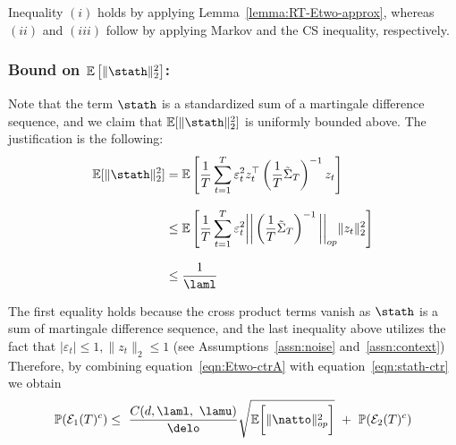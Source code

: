 \documentclass[11pt,letterpaper]{article}
\newcommand{\Prob}{\mathbb{P}}
\newcommand{\Exs}{\mathbb{E}}
\newcommand{\z}{z}
\newcommand{\PT}{\tilde{\Sigma}_T}
\newcommand{\Eone}{\mathcal{E}_1(T)}
\newcommand{\Etwo}{\mathcal{E}_2(T)}
\theoremstyle{plain}
\theoremstyle{definition}  %
\begin{document}
\noindent Inequality $(i)$ holds by applying Lemma~\ref{lemma:RT-Etwo-approx}, whereas $(ii)$ and $(iii)$ follow by applying Markov and the CS inequality, respectively.

\subsubsection*{Bound on $\Exs \left[ \|\stath \|^2_2 \right]$:}
Note that the term $\stath$ is a standardized sum of a martingale difference sequence, and we claim that $\Exs [ \|\stath \|^2_2 ]$ is uniformly bounded above. The justification is the following: 
\begin{align}\label{eqn:stath-ctr}
\notag
   \Exs[\|\stath \|^2_2] 
   & = \Exs \left[ \frac{1}{T} \sum^T_{t=1} \varepsilon_t^2 \z_t^{\top} \left( \frac{1}{T} \PT\right)^{-1} \z_t \right]\\[8pt] \notag
   & \leq \Exs \left[ \frac{1}{T} \sum^T_{t=1} \varepsilon_t^2  \bigg| \bigg|\left( \frac{1}{T} \PT\right)^{-1} \bigg| \bigg|_{op} \|\z_t\|_2^2 \right]\\[8pt]
   &\leq \frac{1}{\laml}
\end{align}

\noindent The first equality holds because the cross product terms vanish as $\stath$ is a sum of martingale difference sequence, and the last inequality above utilizes the fact that $|\varepsilon_t| \leq 1, \|z_t\|_2 \leq 1$ (see Assumptions~\ref{assn:noise} and~\ref{assn:context}) Therefore, by combining equation~\eqref{eqn:Etwo-ctrA}  with equation~\eqref{eqn:stath-ctr} we obtain
\begin{align}
   \Prob(\Eone^c) \leq  \ \frac{C(d, \laml,\ \lamu)}{\delo} \sqrt{\Exs \bigg[ \| \natto \|^2_{op} \bigg]} \ + \ \Prob( \Etwo^c)   
\end{align}
\end{document}
